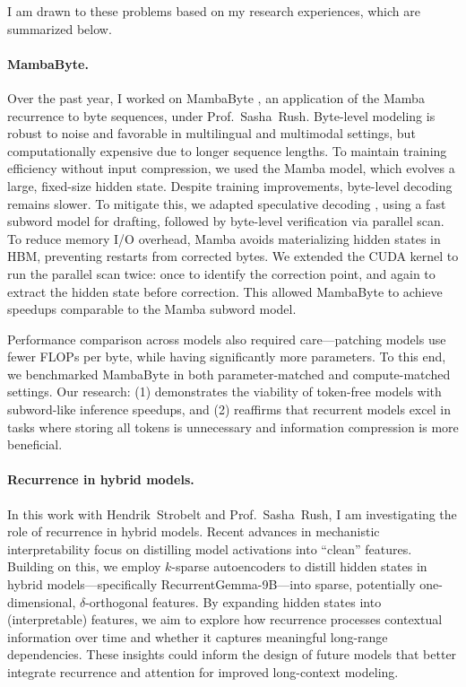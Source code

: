 I am drawn to these problems based on my research experiences, which are summarized below.

\paragraph{MambaByte.}

Over the past year, I worked on MambaByte \citep{wang_mambabyte_2024}, an application of the Mamba recurrence \citep{gu_mamba_2024} to byte sequences, under Prof.~Sasha~Rush.
%
Byte-level modeling is robust to noise and favorable in multilingual and multimodal settings, but computationally expensive due to longer sequence lengths.
%
To maintain training efficiency without input compression, we used the Mamba model, which evolves a large, fixed-size hidden state.
%
Despite training improvements, byte-level decoding remains slower.
%
To mitigate this, we adapted speculative decoding \citep{leviathan_fast_2023}, using a fast subword model for drafting, followed by byte-level verification via parallel scan.
%
To reduce memory I/O overhead, Mamba avoids materializing hidden states in HBM, preventing restarts from corrected bytes.
%
We extended the CUDA kernel to run the parallel scan twice: once to identify the correction point, and again to extract the hidden state before correction.
%
This allowed MambaByte to achieve speedups comparable to the Mamba subword model.

Performance comparison across models also required care---patching models use fewer FLOPs per byte, while having significantly more parameters.
%
To this end, we benchmarked MambaByte in both parameter-matched and compute-matched settings.
%
Our research: (1) demonstrates the viability of token-free models with subword-like inference speedups, and (2) reaffirms that recurrent models excel in tasks where storing all tokens is unnecessary and information compression is more beneficial.
%


\paragraph{Recurrence in hybrid models.}

In this work with Hendrik~Strobelt and Prof.~Sasha~Rush, I am investigating the role of recurrence in hybrid models.
%
Recent advances in mechanistic interpretability focus on distilling model activations into ``clean'' features.
%
Building on this, we employ $k$-sparse autoencoders to distill hidden states in hybrid models---specifically RecurrentGemma-9B---into sparse, potentially one-dimensional, $\delta$-orthogonal features.
%
By expanding hidden states into (interpretable) features, we aim to explore how recurrence processes contextual information over time and whether it captures meaningful long-range dependencies.
% 
These insights could inform the design of future models that better integrate recurrence and attention for improved long-context modeling.

